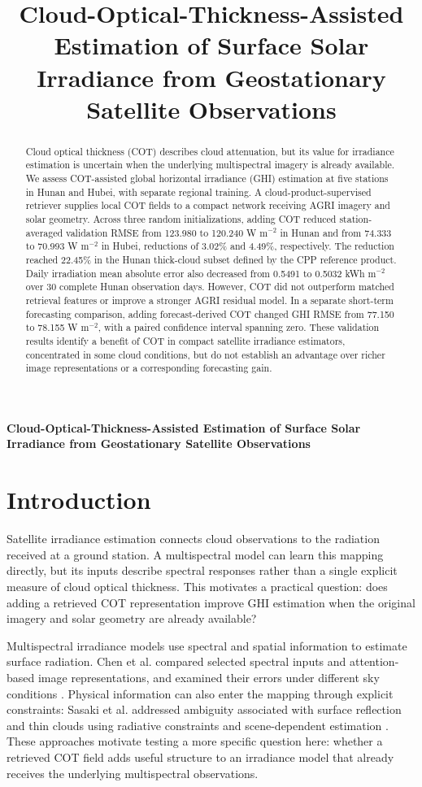 \documentclass[11pt]{article}
\title{Cloud-Optical-Thickness-Assisted Estimation of Surface Solar Irradiance from Geostationary Satellite Observations}
\author{}
\date{}
\begin{document}
\begin{center}
{\LARGE\bfseries Cloud-Optical-Thickness-Assisted Estimation of Surface Solar Irradiance from Geostationary Satellite Observations\par}
\end{center}
\vspace{2mm}
\begin{abstract}
Cloud optical thickness (COT) describes cloud attenuation, but its value for irradiance estimation is uncertain when the underlying multispectral imagery is already available. We assess COT-assisted global horizontal irradiance (GHI) estimation at five stations in Hunan and Hubei, with separate regional training. A cloud-product-supervised retriever supplies local COT fields to a compact network receiving AGRI imagery and solar geometry. Across three random initializations, adding COT reduced station-averaged validation RMSE from 123.980 to 120.240 W m$^{-2}$ in Hunan and from 74.333 to 70.993 W m$^{-2}$ in Hubei, reductions of 3.02\% and 4.49\%, respectively. The reduction reached 22.45\% in the Hunan thick-cloud subset defined by the CPP reference product. Daily irradiation mean absolute error also decreased from 0.5491 to 0.5032 kWh m$^{-2}$ over 30 complete Hunan observation days. However, COT did not outperform matched retrieval features or improve a stronger AGRI residual model. In a separate short-term forecasting comparison, adding forecast-derived COT changed GHI RMSE from 77.150 to 78.155 W m$^{-2}$, with a paired confidence interval spanning zero. These validation results identify a benefit of COT in compact satellite irradiance estimators, concentrated in some cloud conditions, but do not establish an advantage over richer image representations or a corresponding forecasting gain.

\end{abstract}
\section{Introduction}
Satellite irradiance estimation connects cloud observations to the radiation received at a ground station. A multispectral model can learn this mapping directly, but its inputs describe spectral responses rather than a single explicit measure of cloud optical thickness. This motivates a practical question: does adding a retrieved COT representation improve GHI estimation when the original imagery and solar geometry are already available?

Multispectral irradiance models use spectral and spatial information to estimate surface radiation. Chen et al. compared selected spectral inputs and attention-based image representations, and examined their errors under different sky conditions \cite{chen2023}. Physical information can also enter the mapping through explicit constraints: Sasaki et al. addressed ambiguity associated with surface reflection and thin clouds using radiative constraints and scene-dependent estimation \cite{sasaki2024}. These approaches motivate testing a more specific question here: whether a retrieved COT field adds useful structure to an irradiance model that already receives the underlying multispectral observations.
\end{document}
